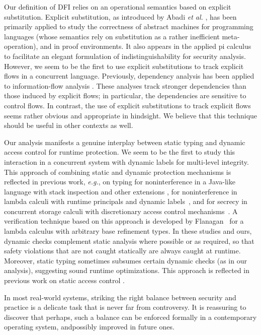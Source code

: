 \documentclass{sigplanconf}
\begin{document}
Our definition of
DFI relies on an operational semantics based on
explicit substitution. Explicit substitution, as introduced by Abadi \emph{et al.} \cite{abadi90explicit}, has been primarily applied to study the
correctness of abstract machines for programming languages (whose semantics rely on substitution as a rather inefficient
meta-operation), and in proof environments. It also appears in the applied pi
calculus \cite{appliedpi} to facilitate an elegant formulation of
indistinguishability for security analysis. However, we seem to be
the first to use explicit substitutions to track explicit flows in
a concurrent language. 
Previously, dependency analysis
\cite{levylabels,cachedep} has been applied to information-flow analysis
\cite{dcc,pottier00information,ZM02}. These analyses track stronger dependencies than those induced by explicit flows; in particular, the dependencies are sensitive to control flows. In contrast, the use of explicit substitutions to track explicit flows seems rather obvious and appropriate in hindsight. We believe that this technique should be useful in other contexts as well. 

Our analysis manifests a genuine interplay between static typing and dynamic access control for runtime protection. We seem to be the first to study this interaction in a concurrent system with dynamic labels for multi-level integrity. This approach of combining static and dynamic protection mechanisms is reflected in previous work, \emph{e.g.}, on typing for noninterference in a Java-like language with stack inspection and other extensions \cite{banerjee03using,pistoia}, for noninterference in lambda calculi with runtime principals and dynamic labels~\cite{runtimeprin,dynseclab}, and for secrecy in concurrent storage calculi with discretionary access control mechanisms~\cite{sectypfac,ChaudhuriConcur06}. A verification technique based on this approach is developed by Flanagan~\cite{hybtc} for a lambda calculus with arbitrary base refinement types. In these studies and ours, dynamic checks complement static analysis where possible or as required, so that safety violations that are not caught statically are always caught at runtime. Moreover, static typing sometimes subsumes certain dynamic checks (as in our analysis), suggesting sound runtime optimizations. This approach is reflected in previous work on static access control \cite{inflowresacc,pottier-skalka-smith-toplas05,sumii}. 

In most real-world systems, striking the right balance between security and practice is a delicate task that is never far from controversy. It is reassuring to discover that perhaps, such a balance can be enforced formally in a contemporary operating system, and\linebreak possibly improved in future ones.
\end{document}
